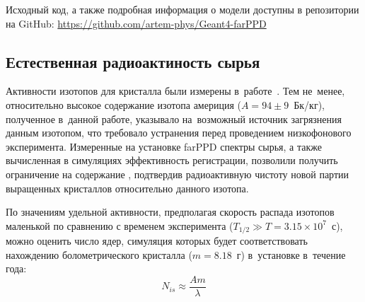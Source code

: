 \documentclass[a4paper,article,14pt]{extarticle}
\begin{document}
Исходный код, а также подробная информация о модели доступны в репозитории на GitHub: \hyperlink{https://github.com/artem-phys/Geant4-farPPD}{https://github.com/artem-phys/Geant4-farPPD}

\subsection{Естественная радиоактиность сырья}
Активности изотопов для кристалла {\TmAlO} были измерены в~работе~\cite{test_bolometric_tm}.
Тем не~менее, относительно высокое содержание изотопа америция {\Am} ($A = 94 \pm 9$~Бк/кг), полученное в~данной работе, указывало на~возможный источник загрязнения данным изотопом, что требовало устранения перед проведением низкофонового эксперимента.
Измеренные на установке farPPD спектры сырья, а также вычисленная в симуляциях эффективность регистрации, позволили получить ограничение на содержание {\Am}, подтвердив радиоактивную чистоту новой партии выращенных кристаллов относительно данного изотопа.

По значениям удельной активности, предполагая скорость распада изотопов маленькой по сравнению с временем эксперимента ($T_{1/2} \gg T = 3.15 \times 10^7$~с), можно оценить число ядер, симуляция которых будет соответствовать нахождению болометрического кристалла ($m = 8.18$~г) в~установке в~течение года:
\begin{equation}
    N_{is} \approx \frac{A m}{\lambda}
\end{equation}

\begin{table}[]
    \centering
    \caption{Активность нуклидов в образце и полное число событий за год, соответствующее данной активности}\label{tab:sources}
\end{table}
\end{document}
